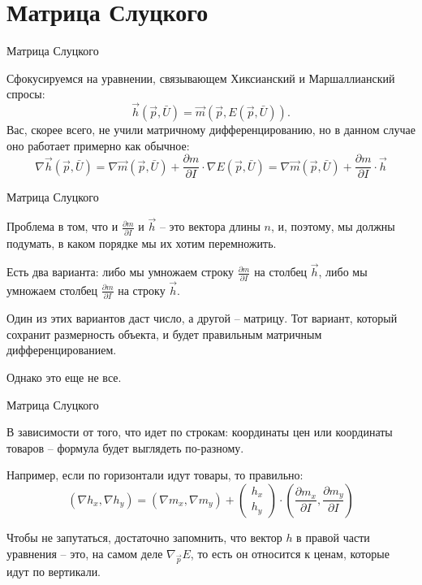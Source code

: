 \documentclass{beamer}
\begin{document}
\section{Матрица Слуцкого}

\begin{frame}{Матрица Слуцкого}

Сфокусируемся на уравнении, связывающем Хиксианский и Маршаллианский спросы:
$$\vec h (\vec p, \bar U) = \vec m(\vec p,  E(\vec p, \bar U)).$$
Вас, скорее всего, не учили матричному дифференцированию, но в данном случае оно работает примерно как обычное:
$$ \nabla \vec h(\vec p,  \bar U) = \nabla \vec m(\vec p,  \bar U) + \frac{\partial m}{\partial I} \cdot \nabla E(\vec p, \bar U) = \nabla \vec m(\vec p,  \bar U) + \frac{\partial m}{\partial I} \cdot \vec h $$

\end{frame}

\begin{frame}{Матрица Слуцкого}

Проблема в том, что и $\frac{\partial m}{\partial I}$ и $\vec h$ – это вектора длины $n$, и, поэтому, мы должны подумать, в каком порядке мы их хотим перемножить. 

Есть два варианта: либо мы умножаем строку $\frac{\partial m}{\partial I}$ на столбец $\vec h$, либо мы умножаем столбец $\frac{\partial m}{\partial I}$ на строку $\vec h$. 

Один из этих вариантов даст число, а другой – матрицу. Тот вариант, который сохранит размерность объекта, и будет правильным матричным дифференцированием. 

Однако это еще не все. 

\end{frame}

\begin{frame}{Матрица Слуцкого}

В зависимости от того, что идет по строкам: координаты цен или координаты товаров – формула будет выглядеть по-разному. 

Например, если по горизонтали идут товары, то правильно:
$$ 
(\nabla h_x, \nabla h_y) = (\nabla m_x, \nabla m_y) + 
\begin{pmatrix} 
h_x \\
h_y
\end{pmatrix} 
\cdot (\frac{\partial m_x}{\partial I}, \frac{\partial m_y}{\partial I})
$$

Чтобы не запутаться, достаточно запомнить, что вектор $h$ в правой части уравнения – это, на самом деле $\nabla_{\vec p} E$, то есть он относится к ценам, которые идут по вертикали.

\end{frame}
\end{document}

